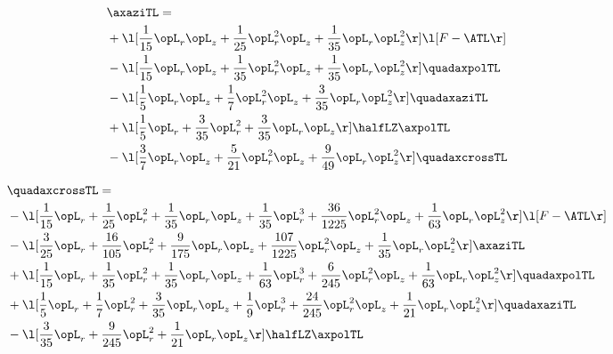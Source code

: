 \begin{alignat}{2} 
\label{eq:linaxaziTL_1} 
& \axaziTL = \\ 
& + \l[ \frac{1}{15} \opL_r \opL_z + \frac{1}{25} \opL_r^{2} \opL_z + \frac{1}{35} \opL_r \opL_z^{2}  \r] \l[ F - \ATL \r] \nonumber \\ 
& - \l[ \frac{1}{15} \opL_r \opL_z + \frac{1}{35} \opL_r^{2} \opL_z + \frac{1}{35} \opL_r \opL_z^{2}  \r] \quadaxpolTL \nonumber \\ 
& - \l[ \frac{1}{5} \opL_r \opL_z + \frac{1}{7} \opL_r^{2} \opL_z + \frac{3}{35} \opL_r \opL_z^{2}  \r] \quadaxaziTL \nonumber \\ 
& + \l[ \frac{1}{5} \opL_r + \frac{3}{35} \opL_r^{2} + \frac{3}{35} \opL_r \opL_z  \r] \halfLZ \axpolTL \nonumber \\ 
& - \l[ \frac{3}{7} \opL_r \opL_z + \frac{5}{21} \opL_r^{2} \opL_z + \frac{9}{49} \opL_r \opL_z^{2}  \r] \quadaxcrossTL \nonumber \\ 
\end{alignat} 


\begin{alignat}{2} 
\label{eq:quadaxcrossTL_1} 
& \quadaxcrossTL = \\ 
& - \l[ \frac{1}{15} \opL_r + \frac{1}{25} \opL_r^{2} + \frac{1}{35} \opL_r \opL_z + \frac{1}{35} \opL_r^{3} + \frac{36}{1225} \opL_r^{2} \opL_z + \frac{1}{63} \opL_r \opL_z^{2}  \r] \l[ F - \ATL \r] \nonumber \\ 
& - \l[ \frac{3}{25} \opL_r + \frac{16}{105} \opL_r^{2} + \frac{9}{175} \opL_r \opL_z + \frac{107}{1225} \opL_r^{2} \opL_z + \frac{1}{35} \opL_r \opL_z^{2}  \r] \axaziTL \nonumber \\ 
& + \l[ \frac{1}{15} \opL_r + \frac{1}{35} \opL_r^{2} + \frac{1}{35} \opL_r \opL_z + \frac{1}{63} \opL_r^{3} + \frac{6}{245} \opL_r^{2} \opL_z + \frac{1}{63} \opL_r \opL_z^{2}  \r] \quadaxpolTL \nonumber \\ 
& + \l[ \frac{1}{5} \opL_r + \frac{1}{7} \opL_r^{2} + \frac{3}{35} \opL_r \opL_z + \frac{1}{9} \opL_r^{3} + \frac{24}{245} \opL_r^{2} \opL_z + \frac{1}{21} \opL_r \opL_z^{2}  \r] \quadaxaziTL \nonumber \\ 
& - \l[ \frac{3}{35} \opL_r + \frac{9}{245} \opL_r^{2} + \frac{1}{21} \opL_r \opL_z  \r] \halfLZ \axpolTL \nonumber \\ 
\end{alignat} 


